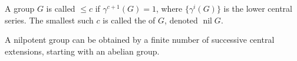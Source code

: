A group $G$ is called  $\leq c$ if $\gamma^{c+1}(G) = 1$, where $\{\gamma^i(G)\}$ is the lower central series. The smallest such $c$ is called the  of $G$, denoted $\operatorname{nil} G$.

A nilpotent group can be obtained by a finite number of successive central extensions, starting with an abelian group.
